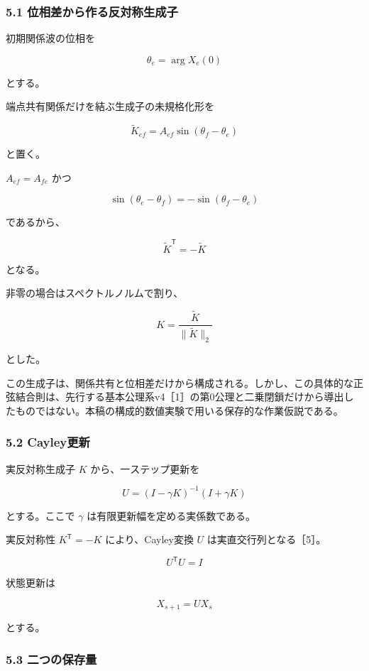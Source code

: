\documentclass[
  10pt,
  a4paper,
]{article}
\begin{document}
\subsubsection{5.1
位相差から作る反対称生成子}\label{ux4f4dux76f8ux5deeux304bux3089ux4f5cux308bux53cdux5bfeux79f0ux751fux6210ux5b50}

初期関係波の位相を

\[
\theta_e=\arg X_e(0)
\]

とする。

端点共有関係だけを結ぶ生成子の未規格化形を

\[
\widetilde K_{ef}
=
A_{ef}\sin(\theta_f-\theta_e)
\]

と置く。

\(A_{ef}=A_{fe}\) かつ

\[
\sin(\theta_e-\theta_f)
=
-\sin(\theta_f-\theta_e)
\]

であるから、

\[
\widetilde K^{\mathsf T}
=
-\widetilde K
\]

となる。

非零の場合はスペクトルノルムで割り、

\[
K
=
\frac{\widetilde K}{\lVert\widetilde K\rVert_2}
\]

とした。

この生成子は、関係共有と位相差だけから構成される。しかし、この具体的な正弦結合則は、先行する基本公理系v4［1］の第0公理と二乗閉鎖だけから導出したものではない。本稿の構成的数値実験で用いる保存的な作業仮説である。

\subsubsection{5.2 Cayley更新}\label{cayleyux66f4ux65b0}

実反対称生成子 \(K\) から、一ステップ更新を

\[
U
=
\left(I-\gamma K\right)^{-1}
\left(I+\gamma K\right)
\]

とする。ここで \(\gamma\) は有限更新幅を定める実係数である。

実反対称性 \(K^{\mathsf T}=-K\) により、Cayley変換 \(U\)
は実直交行列となる［5］。

\[
U^{\mathsf T}U=I
\]

状態更新は

\[
X_{s+1}=UX_s
\]

とする。

\subsubsection{5.3
二つの保存量}\label{ux4e8cux3064ux306eux4fddux5b58ux91cf}
\end{document}
